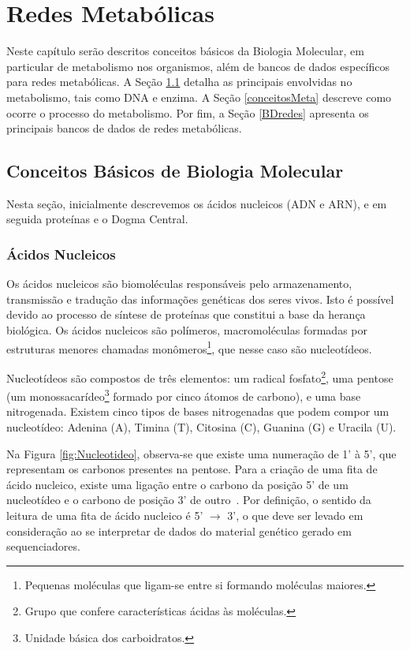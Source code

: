 \chapter{Redes Metabólicas}
 
\indent Neste capítulo serão descritos conceitos básicos da Biologia Molecular, em particular de metabolismo nos organismos, além de bancos de dados específicos para redes metabólicas. A Seção \ref{conceitosBM} detalha as principais envolvidas no metabolismo, tais como DNA e enzima. A Seção \ref{conceitosMeta} descreve como ocorre o processo do metabolismo. Por fim, a Seção \ref{BDredes} apresenta os principais bancos de dados de redes metabólicas.



\section{Conceitos Básicos de Biologia Molecular} \label{conceitosBM}

\indent Nesta seção, inicialmente descrevemos os ácidos nucleicos (ADN e ARN), e em seguida proteínas e o Dogma Central.

\subsection{Ácidos Nucleicos} \label{aceidosNucleicos}

\indent Os ácidos nucleicos são biomoléculas responsáveis pelo armazenamento, transmissão e tradução das informações genéticas dos seres vivos. Isto é possível devido ao processo de síntese de proteínas que constitui a base da herança biológica. Os ácidos nucleicos são polímeros, macromoléculas formadas por estruturas menores chamadas monômeros\footnote{Pequenas moléculas que ligam-se entre si formando moléculas maiores.}, que nesse caso são nucleotídeos.

\indent Nucleotídeos são compostos de três elementos: um radical fosfato\footnote{Grupo que confere características ácidas às moléculas.}, uma pentose (um monossacarídeo\footnote{Unidade básica dos carboidratos.} formado por cinco átomos de carbono), e uma base nitrogenada. Existem cinco tipos de bases nitrogenadas que podem compor um nucleotídeo: Adenina (A), Timina (T), Citosina (C), Guanina (G) e Uracila (U).

\indent Na Figura \ref{fig:Nucleotideo}, observa-se que existe uma numeração de 1' à 5', que representam os carbonos presentes na pentose. Para a criação de uma fita de ácido nucleico, existe uma ligação entre o carbono da posição 5' de um nucleotídeo e o carbono de posição 3' de outro~\cite{setubal97}. Por definição, o sentido da leitura de uma fita de ácido nucleico é 5' $\rightarrow$ 3', o que deve ser levado em consideração ao se interpretar de dados do material genético gerado em sequenciadores.

